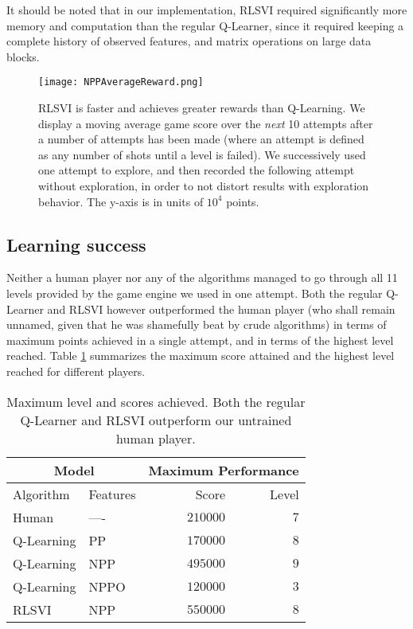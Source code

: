 \documentclass[fleqn,10pt]{SelfArx} %
\begin{document}
It should be noted that in our implementation, RLSVI required significantly more memory and computation than the regular Q-Learner, since it required keeping a complete history of observed features, and matrix operations on large data blocks.

\begin{figure}[ht]\centering
\texttt{[image: NPPAverageReward.png]}
\caption{RLSVI is faster and achieves greater rewards than Q-Learning. We display a moving average game score over the \emph{next} 10 attempts after a number of attempts has been made (where an attempt is defined as any number of shots until a level is failed). We successively used one attempt to explore, and then recorded the following attempt without exploration, in order to not distort results with exploration behavior. The y-axis is in units of $10^4$ points.}
\label{fig:NPPAverageReward}
\end{figure}


\subsection{Learning success}

Neither a human player nor any of the algorithms managed to go through all 11 levels provided by the game engine we used in one attempt. Both the regular Q-Learner and RLSVI however outperformed the human player (who shall remain unnamed, given that he was shamefully beat by crude algorithms) in terms of maximum points achieved in a single attempt, and in terms of the highest level reached. Table \ref{tab:max_score} summarizes the maximum score attained and the highest level reached for different players.

\begin{table}[hbt]
\centering
\begin{tabular}{llrr}
\toprule
\multicolumn{2}{c}{Model} & \multicolumn{2}{c}{Maximum Performance}\\
\midrule
Algorithm & Features & Score & Level \\
\midrule
Human & ---- & $210000$ & $7$  \\
Q-Learning & PP & $170000$ & $8$ \\
Q-Learning & NPP & $495000$ & $9$ \\
Q-Learning & NPPO & $120000$ & $3$  \\
RLSVI & NPP & $550000$ & $8$ \\
\bottomrule
\end{tabular}
\caption{Maximum level and scores achieved. Both the regular Q-Learner and RLSVI outperform our untrained human player.}
\label{tab:max_score}
\end{table}
\end{document}

